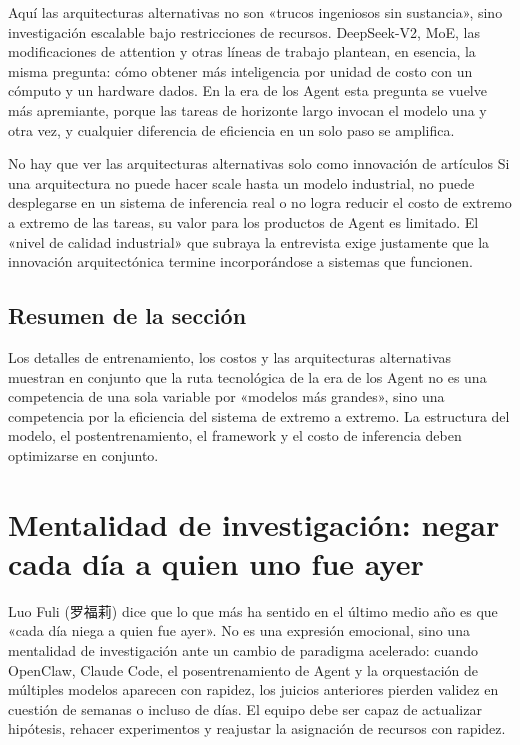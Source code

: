 \documentclass[a4paper]{article}
\begin{document}
Aquí las arquitecturas alternativas no son «trucos ingeniosos sin sustancia», sino investigación escalable bajo restricciones de recursos. DeepSeek-V2, MoE, las modificaciones de attention y otras líneas de trabajo plantean, en esencia, la misma pregunta: cómo obtener más inteligencia por unidad de costo con un cómputo y un hardware dados. En la era de los Agent esta pregunta se vuelve más apremiante, porque las tareas de horizonte largo invocan el modelo una y otra vez, y cualquier diferencia de eficiencia en un solo paso se amplifica.

\begin{warningbox}{No hay que ver las arquitecturas alternativas solo como innovación de artículos}
Si una arquitectura no puede hacer scale hasta un modelo industrial, no puede desplegarse en un sistema de inferencia real o no logra reducir el costo de extremo a extremo de las tareas, su valor para los productos de Agent es limitado. El «nivel de calidad industrial» que subraya la entrevista exige justamente que la innovación arquitectónica termine incorporándose a sistemas que funcionen.
\end{warningbox}

\subsection{Resumen de la sección}

Los detalles de entrenamiento, los costos y las arquitecturas alternativas muestran en conjunto que la ruta tecnológica de la era de los Agent no es una competencia de una sola variable por «modelos más grandes», sino una competencia por la eficiencia del sistema de extremo a extremo. La estructura del modelo, el postentrenamiento, el framework y el costo de inferencia deben optimizarse en conjunto.
\section{Mentalidad de investigación: negar cada día a quien uno fue ayer}

Luo Fuli (罗福莉) dice que lo que más ha sentido en el último medio año es que «cada día niega a quien fue ayer». No es una expresión emocional, sino una mentalidad de investigación ante un cambio de paradigma acelerado: cuando OpenClaw, Claude Code, el posentrenamiento de Agent y la orquestación de múltiples modelos aparecen con rapidez, los juicios anteriores pierden validez en cuestión de semanas o incluso de días. El equipo debe ser capaz de actualizar hipótesis, rehacer experimentos y reajustar la asignación de recursos con rapidez.
\end{document}
